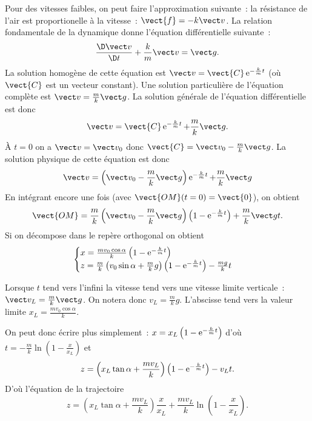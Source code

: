Pour des vitesses faibles, on peut faire l'approximation suivante~: la résistance de l'air est proportionelle à la vitesse~: $\vect{f}=-k \vv$. La relation fondamentale de la dynamique donne l'équation différentielle suivante~:
\begin{equation}
  \derived{\vv}{t}+\frac{k}{m}\vv = \vg.
\end{equation}
La solution homogène de cette équation est $\vv = \vect{C}\e^{-\frac{k}{m}t}$ (où $\vect{C}$ est un vecteur constant). Une solution particulière de l'équation complète est $\vv = \frac{m}{k}\vg$. La solution générale de l'équation différentielle est donc
\begin{equation}
  \vv = \vect{C}\e^{-\frac{k}{m}t} + \frac{m}{k}\vg.
\end{equation}
À $t=0$ on a $\vv=\vv_0$ donc $\vect{C}=\vv_0 - \frac{m}{k}\vg$. La solution physique de cette équation est donc
\begin{equation}
  \vv = \left( \vv_0 - \frac{m}{k}\vg \right) \e^{-\frac{k}{m}t} + \frac{m}{k}\vg
\end{equation}
En intégrant encore une fois (avec $\vect{OM}(t=0)=\vect{0}$), on obtient
\begin{equation}
  \vect{OM} = \frac{m}{k}\left(\vv_0 - \frac{m}{k}\vg\right)\left(1 - \e^{-\frac{k}{m}t}\right) + \frac{m}{k}\vg t.
\end{equation}
Si on décompose dans le repère orthogonal on obtient
\begin{equation}
  \begin{cases}
    x = \frac{m v_0 \cos\alpha}{k}\left(1 - \operatorname{e}^{-\frac{k}{m}t}\right) \\
    z = \frac{m}{k}\left(v_0\sin\alpha + \frac{m}{k}g\right) \left(1 - \operatorname{e}^{-\frac{k}{m}t}\right) - \frac{mg}{k}t
  \end{cases}
\end{equation}

Lorsque $t$ tend vers l'infini la vitesse tend vers une vitesse limite verticale~: $\vv_L = \frac{m}{k}\vg$. On notera donc $v_L = \frac{m}{k}g$. L'abscisse tend vers la valeur limite $x_L = \frac{mv_0 \cos \alpha}{k}$.

On peut donc écrire plus simplement~: $x = x_L\left(1-\operatorname{e}^{-\frac{k}{m}t}\right)$ d'où $t = -\frac{m}{k}\ln\left(1-\frac{x}{x_L}\right)$ et
\begin{equation}
  z = \left(x_L\tan \alpha + \frac{mv_L}{k}\right)\left(1-\operatorname{e}^{-\frac{k}{m}t}\right) -v_L t.
\end{equation}
D'où l'équation de la trajectoire
\begin{equation}
  z = \left(x_L\tan \alpha + \frac{mv_L}{k}\right)\frac{x}{x_L} + \frac{m v_L}{k}\ln\left(1-\frac{x}{x_L}\right).
\end{equation}

